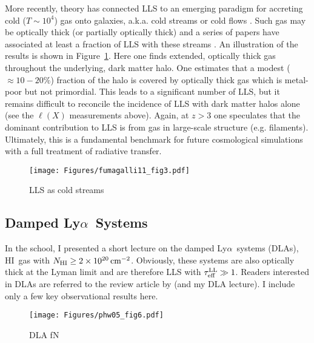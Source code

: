 \documentclass[graybox]{svmult}
\newcommand{\HI}{H{\sc I}}
\def\lya{Ly$\alpha$}
\newcommand{\mnhi}{N_{\rm HI}}
\def\cm#1{\, {\rm cm^{#1}}}
\def\mtll{\tau_{\rm eff}^{\rm LL}}
\begin{document}
More recently, theory has connected LLS to an emerging paradigm
for accreting cold ($T \sim 10^4$) gas onto galaxies,
a.k.a. cold streams or cold flows \cite[e.g.]{db06,keres09a}.
Such gas may be optically thick (or partially optically thick)
and a series of papers have associated at least a fraction
of LLS with these streams
\cite[e.g.]{fg11,fpk+11,freeke12}.
An illustration of the results is shown
in Figure~\ref{fig:f11_fig3}.
Here one finds		
extended, optically thick gas throughout the underlying,
dark matter halo.
One estimates that a modest  ($\approx 10-20\%$)
fraction of the halo is covered by 
optically thick gas which is metal-poor but not primordial.  
This leads to a significant number of LLS, but it remains
difficult to reconcile the incidence of LLS with dark matter halos
alone (see the $\ell(X)$ measurements above).
Again, at $z>3$ one speculates that the 
dominant contribution to LLS is from gas in large-scale structure (e.g.
filaments).  Ultimately, this is a 
fundamental benchmark for future cosmological simulations with
a full treatment of radiative transfer.

%
\begin{figure}[b]
\sidecaption
\texttt{[image: Figures/fumagalli11\_fig3.pdf]}
%
%
\caption{LLS as cold streams
}
\label{fig:f11_fig3}       %
\end{figure}

\subsection{Damped \lya\ Systems}

In the school, I presented a short lecture on the damped \lya\
systems (DLAs), \HI\ gas with $\mnhi \ge 2 \times 10^{20} \cm{-2}$.
Obviously, these systems are also optically thick at the Lyman
limit and are therefore LLS with $\mtll \gg 1$.
Readers interested in DLAs are referred to the review article
by \cite{wgp05} (and my DLA lecture).  I include only a few key
observational results here.

%
\begin{figure}[b]
\sidecaption
\texttt{[image: Figures/phw05\_fig6.pdf]}
%
%
\caption{DLA fN
}
\label{fig:phw05_fN}       %
\end{figure}
\end{document}

